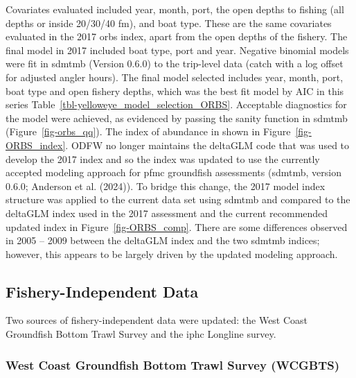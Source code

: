 \documentclass[
]{scrartcl}
\begin{document}
Covariates evaluated included year, month, port, the open depths to
fishing (all depths or inside 20/30/40 fm), and boat type. These are the
same covariates evaluated in the 2017 \gls{orbs} index, apart from the
open depths of the fishery. The final model in 2017 included boat type,
port and year. Negative binomial models were fit in \gls{sdmtmb}
(Version 0.6.0) to the trip-level data (catch with a log offset for
adjusted angler hours). The final model selected includes year, month,
port, boat type and open fishery depths, which was the best fit model by
AIC in this series Table~\ref{tbl-yelloweye_model_selection_ORBS}.
Acceptable diagnostics for the model were achieved, as evidenced by
passing the sanity function in \gls{sdmtmb} (Figure~\ref{fig-orbs_qq}).
The index of abundance in shown in Figure~\ref{fig-ORBS_index}. ODFW no
longer maintains the deltaGLM code that was used to develop the 2017
index and so the index was updated to use the currently accepted
modeling approach for \gls{pfmc} groundfish assessments (\gls{sdmtmb},
version 0.6.0; Anderson et al. (2024)). To bridge this change, the 2017
model index structure was applied to the current data set using
\gls{sdmtmb} and compared to the deltaGLM index used in the 2017
assessment and the current recommended updated index in
Figure~\ref{fig-ORBS_comp}. There are some differences observed in 2005
-- 2009 between the deltaGLM index and the two \gls{sdmtmb} indices;
however, this appears to be largely driven by the updated modeling
approach.

\subsection{Fishery-Independent Data}\label{fishery-independent-data}

Two sources of fishery-independent data were updated: the West Coast
Groundfish Bottom Trawl Survey and the \gls{iphc} Longline survey.

\subsubsection{West Coast Groundfish Bottom Trawl Survey
(WCGBTS)}\label{west-coast-groundfish-bottom-trawl-survey-wcgbts}
\end{document}
